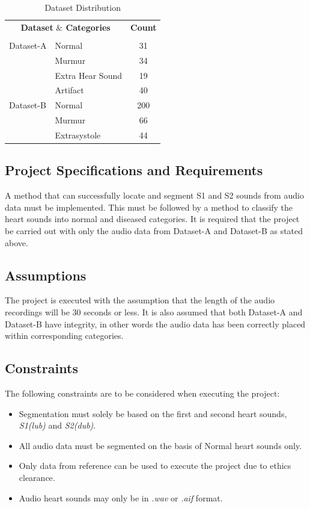 \documentclass[10pt,twocolumn]{witseiepaper}
\begin{document}
\begin{table}[h!]
\centering
\caption{Dataset Distribution}
\begin{tabular}{llc}\hline%
\multicolumn {2}{c}{\textbf{Dataset} \textbf{ $\&$ Categories}}    & \textbf{Count}\\
&        & \\\hline%
Dataset-A    & Normal       & 31\\\cline{2-3}
& Murmur                      & 34\\\cline{2-3}
& Extra Hear Sound           & 19\\\cline{2-3}
& Artifact                   & 40\\\hline
Dataset-B    & Normal          & 200\\\cline{2-3}
& Murmur                     & 66\\\cline{2-3}
& Extrasystole                     & 44\\\hline
\end{tabular}
    \label{tab:my_label}
\end{table}
\subsection{Project Specifications and Requirements}
 A method that can successfully locate and segment S1 and S2 sounds from audio data must be implemented. This must be followed by a method to classify the heart sounds into normal and diseased categories. It is required that the project be carried out with only the audio data from Dataset-A and Dataset-B as stated above.

\subsection{Assumptions}
The project is executed with the assumption that the length of the audio recordings will be 30 seconds or less. It is also assumed that both Dataset-A and Dataset-B have integrity, in other words the audio data has been correctly placed within corresponding categories. 

\subsection{Constraints}
The following constraints are to be considered when executing the project:

\begin{itemize}
    \item Segmentation must solely be based on the first and second heart sounds,                \textit{S1(lub)} and \textit{S2(dub)}.
    \item All audio data must be segmented on the basis of Normal heart sounds only.
    \item Only data from reference \cite{bentley2011pascal} can be used to execute the project due to ethics clearance.
    \item Audio heart sounds may only be in \textit{.wav} or \textit{.aif} format.
\end{itemize}
\end{document}
